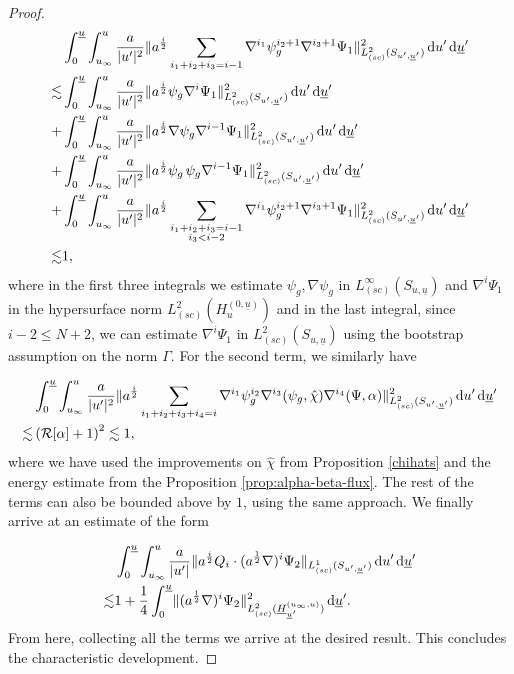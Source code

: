 \documentclass{amsart}
\newcommand{\Hbar}{\underline{H}}
\newcommand{\aln}{(\al \nabla)^i}
\newcommand{\ali}{a^{\frac{i}{2}}}
\newcommand{\hsp}{\hspace{.5mm}}
\newcommand{\dubarprime}{\hspace{.5mm} \text{d} \ubar^{\prime}}
\newcommand{\intu}{\int_{u_{\infty}}^u}
\newcommand{\intubar}{\int_0^{\ubar}}
\newcommand{\chihat}{\hat{\chi}}
\newcommand{\upr}{\lvert u^\prime \rvert}
\newcommand{\al}{a^{\frac{1}{2}}}
\newcommand{\ubar}{\underline{u}}
\newcommand{\sumitm}{\sum_{i_1+i_2+i_3=i-1}}
\newcommand{\sumif}{\sum_{i_1+i_2+i_3+i_4=i}}
\newcommand{\nablap}{\nabla^{i_1}\psi_g^{i_2}}
\newcommand{\nablapp}{\nabla^{i_1}\psi_g^{i_2+1}}
\newcommand{\scaleoneSuprimeubarprime}[1]{\lVert{#1} \rVert_{L^1_{(sc)}(S_{u^\prime,\ubar^\prime})}}
\newcommand{\scaletwoSuprimeubarprime}[1]{\lVert{#1} \rVert_{L^2_{(sc)}(S_{u^\prime,\ubar^\prime})}}
\newcommand{\duprime}{\hspace{.5mm} \text{d}u^{\prime}}
\newcommand{\nablat}{\nabla^{i_3}}
\newcommand{\nablaf}{\nabla^{i_4}}
\begin{document}
{\begin{proof}
\begin{equation}
\begin{split}
    &\intubar \intu \frac{a}{\upr^2}\scaletwoSuprimeubarprime{\ali \sumitm \nablapp \nabla^{i_3+1}\Psi_1}^2 \duprime \dubarprime \\ \lesssim &\intubar \intu \frac{a}{\upr^2}\scaletwoSuprimeubarprime{\ali \psi_g \nabla^i \Psi_1}^2 \duprime \dubarprime \\+& \intubar \intu \frac{a}{\upr^2}\scaletwoSuprimeubarprime{\ali \nabla \psi_g \nabla^{i-1}\Psi_1 }^2 \duprime \dubarprime \\+& \intubar \intu \frac{a}{\upr^2}\scaletwoSuprimeubarprime{\ali \psi_g \hsp  \psi_g  \nabla^{i-1}\Psi_1}^2 \duprime \dubarprime \\+&\intubar \intu \frac{a}{\upr^2}\scaletwoSuprimeubarprime{\ali \sum_{\substack{i_1+i_2+i_3=i-1\\ i_3< i-2}} \nablapp \nabla^{i_3+1}\Psi_1}^2 \duprime \dubarprime \\ \lesssim &1, 
\end{split}
\end{equation}where in the first three integrals we estimate $\psi_g, \nabla \psi_g$ in $L^{\infty}_{(sc)}(S_{u,\ubar})$ and $\nabla^i \Psi_1$ in the hypersurface norm $L^2_{(sc)}(H_u^{(0,\ubar)})$ and in the last integral, since $i-2\leq N+2$, we can estimate $\nabla^i \Psi_1$ in $L^2_{(sc)}(S_{u,\ubar})$ using the bootstrap assumption on the norm $\Gamma$. For the second term, we similarly have

\begin{align}  \nonumber
    &\intubar \intu \frac{a}{\upr^2}\scaletwoSuprimeubarprime{\ali \sumif \nablap \nablat (\psi_g, \chihat) \nablaf(\Psi, \alpha) }^2 \duprime \dubarprime \\ \lesssim & \left(\mathcal{R}[\alpha]+1 \right)^2 \lesssim 1,
\end{align}where we have used the improvements on $\chihat$ from Proposition \ref{chihats} and the energy estimate from the Proposition \ref{prop:alpha-beta-flux}. The rest of the terms can also be bounded above by $1$, using the same approach. We finally arrive at an estimate of the form 

\begin{equation}\label{comb2}
    \begin{split}
        &\intubar \intu  \frac{a}{\upr} \scaleoneSuprimeubarprime{\ali Q_i \cdot \aln \Psi_2 }  \duprime \dubarprime \\ \lesssim & 1 + \frac{1}{4} \intubar \lVert \aln \Psi_2 \rVert^2_{L^2_{(sc)}(\Hbar_{\ubar^{\prime}}^{(u_{\infty}, u)})} \dubarprime.
        \end{split}
\end{equation}From here, collecting all the terms we arrive at the desired result. This concludes the characteristic development.
\end{proof}

}
\end{document}
